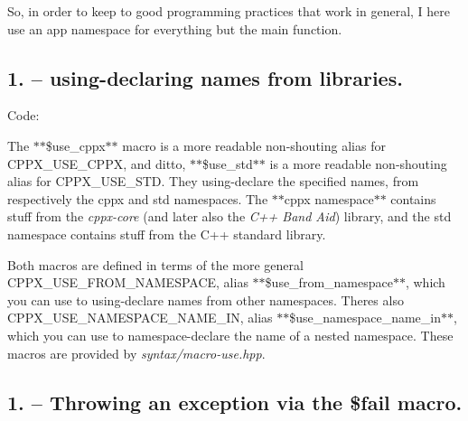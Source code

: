 So, in order to keep to good programming practices that work in general, I here use an {\ttfamily app} namespace for everything but the {\ttfamily main} function.

\subsection*{1. – {\ttfamily using}-\/declaring names from libraries.}

Code\+:


\begin{DoxyCode}{0}
\DoxyCodeLine{    );}
\DoxyCodeLine{    );}
\end{DoxyCode}


The $\ast$$\ast${\ttfamily \$use\+\_\+cppx}$\ast$$\ast$ macro is a more readable non-\/shouting alias for {\ttfamily C\+P\+P\+X\+\_\+\+U\+S\+E\+\_\+\+C\+P\+PX}, and ditto, $\ast$$\ast${\ttfamily \$use\+\_\+std}$\ast$$\ast$ is a more readable non-\/shouting alias for {\ttfamily C\+P\+P\+X\+\_\+\+U\+S\+E\+\_\+\+S\+TD}. They {\ttfamily using}-\/declare the specified names, from respectively the {\ttfamily cppx} and {\ttfamily std} namespaces. The $\ast$$\ast${\ttfamily cppx} namespace$\ast$$\ast$ contains stuff from the {\itshape cppx-\/core} (and later also the {\itshape C++ Band Aid}) library, and the {\ttfamily std} namespace contains stuff from the C++ standard library.

Both macros are defined in terms of the more general {\ttfamily C\+P\+P\+X\+\_\+\+U\+S\+E\+\_\+\+F\+R\+O\+M\+\_\+\+N\+A\+M\+E\+S\+P\+A\+CE}, alias $\ast$$\ast${\ttfamily \$use\+\_\+from\+\_\+namespace}$\ast$$\ast$, which you can use to {\ttfamily using}-\/declare names from other namespaces. There\textquotesingle{}s also {\ttfamily C\+P\+P\+X\+\_\+\+U\+S\+E\+\_\+\+N\+A\+M\+E\+S\+P\+A\+C\+E\+\_\+\+N\+A\+M\+E\+\_\+\+IN}, alias $\ast$$\ast${\ttfamily \$use\+\_\+namespace\+\_\+name\+\_\+in}$\ast$$\ast$, which you can use to {\ttfamily namespace}-\/declare the name of a nested namespace. These macros are provided by {\itshape syntax/macro-\/use.\+hpp}.

\subsection*{1. – Throwing an exception via the {\ttfamily \$fail} macro.}

